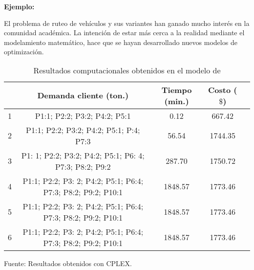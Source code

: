 {\bf Ejemplo:}\par

El problema de ruteo de vehículos \citep{Ombuki, Yeun} y sus variantes han ganado mucho interés en la comunidad académica. La intención de estar más cerca a la realidad mediante el modelamiento matemático, hace que se hayan desarrollado nuevos modelos de optimización. \par
\vskip 0.2cm

\begin{table}[h!]
\begin{center}
\caption{\small{Resultados computacionales obtenidos en el modelo de \cite{Ombuki}}}
\end{center}
\vskip -0.7cm
\begin{tabular}{|c|c|c|c|c|}
\hline 
\rowcolor{LightBlue2}{\small Escenarios} & {\small Demanda cliente (ton.)} & {\small Tiempo (min.)} & {\small Costo ($\$$)} \\ 
\hline 
{\small 1} & {\small P1:1; P2:2; P3:2; P4:2; P5:1} & {\small 0.12} & {\small 667.42} \\ 
\hline 
{\small 2} & {\small P1:1; P2:2; P3:2; P4:2; P5:1; P:4; P7:3} & {\small 56.54} & {\small 1744.35} \\ 
\hline 
{\small 3} & {\small P1: 1; P2:2; P3:2; P4:2; P5:1; P6: 4; P7:3; P8:2; P9:2} & {\small 287.70} & {\small 1750.72} \\ 
\hline 
{\small 4} & {\small P1:1; P2:2; P3: 2; P4:2; P5:1; P6:4; P7:3; P8:2; P9:2; P10:1} & {\small 1848.57} & {\small 1773.46} \\ 
\hline 
{\small 5} & {\small P1:1; P2:2; P3: 2; P4:2; P5:1; P6:4; P7:3; P8:2; P9:2; P10:1} & {\small 1848.57} & {\small 1773.46} \\ 
\hline 
{\small 6} & {\small P1:1; P2:2; P3: 2; P4:2; P5:1; P6:4; P7:3; P8:2; P9:2; P10:1} & {\small 1848.57} & {\small 1773.46} \\ 
\hline 
\end{tabular} 
\begin{center}
\vskip -0.2cm
{\small{Fuente: Resultados obtenidos con CPLEX.}}
\end{center}
\end{table}



